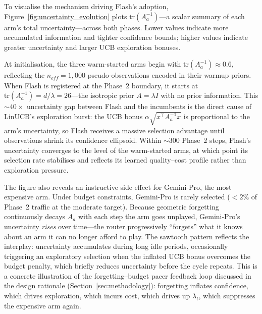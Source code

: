 To visualise the mechanism driving Flash's adoption, Figure~\ref{fig:uncertainty_evolution} plots $\mathrm{tr}(A_a^{-1})$---a scalar summary of each arm's total uncertainty---across both phases.
Lower values indicate more accumulated information and tighter confidence bounds; higher values indicate greater uncertainty and larger UCB exploration bonuses.

At initialisation, the three warm-started arms begin with $\mathrm{tr}(A_a^{-1}) \approx 0.6$, reflecting the $n_\mathit{eff}{=}1{,}000$ pseudo-observations encoded in their warmup priors.
When Flash is registered at the Phase~2 boundary, it starts at $\mathrm{tr}(A_a^{-1}) = d/\lambda = 26$---the isotropic prior $A = \lambda I$ with no prior information.
This ${\sim}40{\times}$ uncertainty gap between Flash and the incumbents is the direct cause of LinUCB's exploration burst: the UCB bonus $\alpha\sqrt{x^\top A_a^{-1} x}$ is proportional to the arm's uncertainty, so Flash receives a massive selection advantage until observations shrink its confidence ellipsoid.
Within ${\sim}300$ Phase~2 steps, Flash's uncertainty converges to the level of the warm-started arms, at which point its selection rate stabilises and reflects its learned quality--cost profile rather than exploration pressure.

The figure also reveals an instructive side effect for Gemini-Pro, the most expensive arm.
Under budget constraints, Gemini-Pro is rarely selected ($<2\%$ of Phase~2 traffic at the moderate target).
Because geometric forgetting continuously decays $A_a$ with each step the arm goes unplayed, Gemini-Pro's uncertainty \emph{rises} over time---the router progressively ``forgets'' what it knows about an arm it can no longer afford to play.
The sawtooth pattern reflects the interplay: uncertainty accumulates during long idle periods, occasionally triggering an exploratory selection when the inflated UCB bonus overcomes the budget penalty, which briefly reduces uncertainty before the cycle repeats.
This is a concrete illustration of the forgetting--budget pacer feedback loop discussed in the design rationale (Section~\ref{sec:methodology}): forgetting inflates confidence, which drives exploration, which incurs cost, which drives up $\lambda_t$, which suppresses the expensive arm again.
